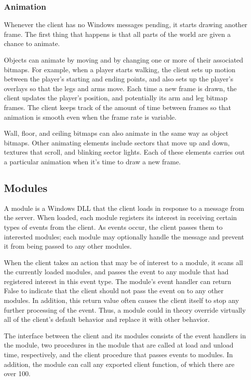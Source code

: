 \subsubsection{Animation}

Whenever the client has no Windows messages pending, it starts drawing
another frame.  The first thing that happens is that all parts of the
world are given a chance to animate.

Objects can animate by moving and by changing one or more of their
associated bitmaps.  For example, when a player starts walking, the
client sets up motion between the player's starting and ending points,
and also sets up the player's overlays so that the legs and arms
move.  Each time a new frame is drawn, the client updates the player's
position, and potentially its arm and leg bitmap frames.  The client
keeps track of the amount of time between frames so that animation is
smooth even when the frame rate is variable.

Wall, floor, and ceiling bitmaps can also animate in the same way as
object bitmaps.  Other animating elements include sectors that move up
and down, textures that scroll, and blinking sector lights.  Each of
these elements carries out a particular animation when it's time to
draw a new frame.

\subsection{Modules}
\label{sec:modules}

A module is a Windows DLL that the client loads in response to a
message from the server.  When loaded, each module registers its
interest in receiving certain types of events from the client.  As
events occur, the client passes them to interested modules; each
module may optionally handle the message and prevent it from being
passed to any other modules.

When the client takes an action that may be of interest to a module,
it scans all the currently loaded modules, and passes the event to any
module that had registered interest in this event type.  The module's
event handler can return False to indicate that the client should not
pass the event on to any other modules.  In addition, this return
value often causes the client itself to stop any further processing of
the event.  Thus, a module could in theory override virtually all of
the client's default behavior and replace it with other behavior.

The interface between the client and its modules consists of the event
handlers in the module, two procedures in the module that are called
at load and unload time, respectively, and the client procedure that
passes events to modules.  In addition, the module can call any
exported client function, of which there are over 100.

